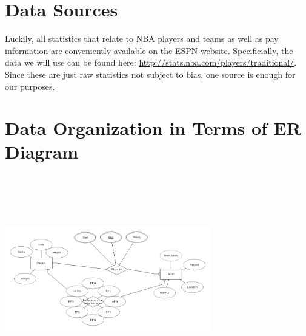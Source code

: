 \documentclass[journal]{vgtc}                %
\begin{document}
\section{Data Sources}
Luckily, all statistics that relate to NBA players and teams as well as pay information are conveniently available on the ESPN website. Specificially, the data we will use can be found here: \url{http://stats.nba.com/players/traditional/}. Since these are just raw statistics not subject to bias, one source is enough for our purposes.

\section{Data Organization in Terms of ER Diagram}
\includegraphics[width=9cm, height=9cm]{ERdiagram}
\end{document}
